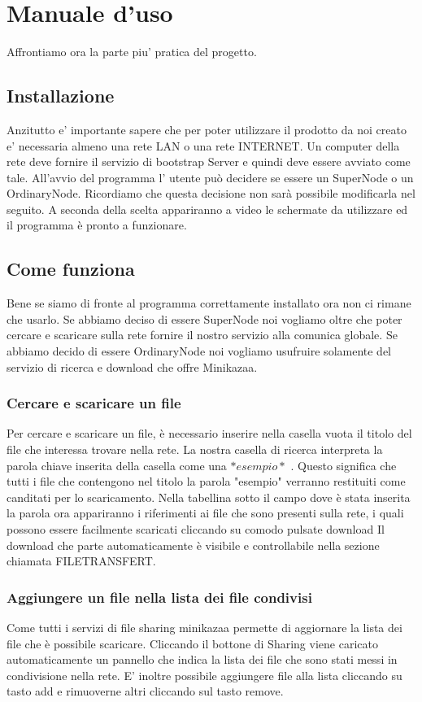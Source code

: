 \chapter{Manuale d'uso}
Affrontiamo ora la parte piu' pratica del progetto.
\section{Installazione}
Anzitutto e' importante sapere che per poter utilizzare il prodotto da noi creato e' necessaria almeno una rete LAN o una rete INTERNET.
Un computer della rete deve fornire il servizio di bootstrap Server e quindi deve essere avviato come tale.
All'avvio del programma l' utente può decidere se essere un SuperNode o un OrdinaryNode.
Ricordiamo che questa decisione non sarà possibile modificarla nel seguito. 
A seconda della scelta appariranno a video le schermate da utilizzare ed il programma è pronto a funzionare.

\section{Come funziona}
Bene se siamo di fronte al programma correttamente installato ora non ci rimane che usarlo.
Se abbiamo deciso di essere SuperNode noi vogliamo oltre che poter cercare e scaricare sulla rete fornire il nostro servizio alla comunica globale.
Se abbiamo decido di essere OrdinaryNode noi vogliamo usufruire solamente del servizio di ricerca e download che offre Minikazaa.
	\subsection{Cercare e scaricare un file}
Per cercare e scaricare un file, è necessario inserire nella casella vuota il titolo del file che interessa trovare nella rete.
La nostra casella di ricerca interpreta la parola chiave inserita della casella come una $ *esempio* $ . Questo significa che tutti i file che contengono nel titolo la parola "esempio" verranno restituiti come canditati per lo scaricamento.
Nella tabellina sotto il campo dove è stata inserita la parola ora appariranno i riferimenti ai file che sono presenti sulla rete, i quali possono essere facilmente scaricati cliccando su comodo pulsate download
Il download che parte automaticamente è visibile e controllabile nella sezione chiamata FILETRANSFERT.

	\subsection{Aggiungere un file nella lista dei file condivisi}
Come tutti i servizi di file sharing minikazaa permette di aggiornare la lista dei file che è possibile scaricare.
Cliccando il bottone di Sharing viene caricato automaticamente un pannello che indica la lista dei file che sono stati messi in condivisione nella rete.
E' inoltre possibile aggiungere file alla lista cliccando su tasto add e rimuoverne altri cliccando sul tasto remove.

